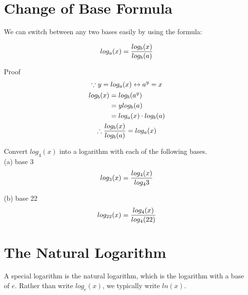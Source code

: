 \section{Change of Base Formula}

We can switch between any two bases easily by using the formula: \\

\begin{theorem}
	\begin{align}
		log_a(x) = {log_b(x) \over log_b(a)}
	\end{align}
\end{theorem}

\begin{exercise}\nonumber
	Proof \\
	\begin{gather*}
		\because y = log_a(x) \leftrightarrow a^y = x \\
		\begin{align}
			log_b(x) & = log_b(a^y)              \\
			         & = ylog_b(a)               \\
			         & = log_a(x) \cdot log_b(a)
		\end{align}
		\\
		\therefore {log_b(x) \over log_b(a)} = log_a(x)
	\end{gather*}
\end{exercise}

\begin{exercise}\nonumber
	Convert $ log_4(x) $ into a logarithm with each of the following bases. \\

	(a) base 3 \\

	$$
	log_3(x) = {log_4(x) \over log_4{3}}
	$$

	(b) base 22 \\

	$$
	log_{22}(x) = {log_4(x) \over log_4(22)}
	$$
\end{exercise}

\section{The Natural Logarithm}

A special logarithm is the natural logarithm, which is the logarithm with a base of $ e $. Rather than write $ log_e(x) $, we typically write $ ln(x) $. \\

